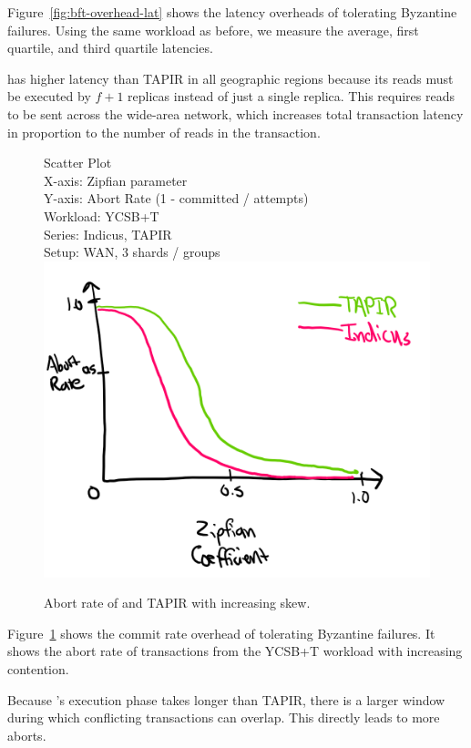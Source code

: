 Figure~\ref{fig:bft-overhead-lat} shows the latency overheads of tolerating
Byzantine failures. Using the same workload as before, we measure the average,
first quartile, and third quartile latencies. 

\sys{} has higher latency than TAPIR in all geographic regions because its
reads must be executed by $f+1$ replicas instead of just a single replica. This
requires reads to be sent across the wide-area network, which increases total
transaction latency in proportion to the number of reads in the transaction.

\begin{figure}
  Scatter Plot\\
  X-axis: Zipfian parameter\\
  Y-axis: Abort Rate (1 - committed / attempts)\\
  Workload: YCSB+T\\
  Series: Indicus, TAPIR\\
  Setup: WAN, 3 shards / groups\\
  \includegraphics[width=\columnwidth]{figures/eval/bft-overhead-aborts.png}
  \caption{Abort rate of \sys{} and TAPIR with increasing skew.}
  \label{fig:bft-overhead-aborts}
\end{figure}

Figure~\ref{fig:bft-overhead-aborts} shows the commit rate overhead of tolerating
Byzantine failures. It shows the abort rate of transactions from the YCSB+T
workload with increasing contention. 

Because \sys{}'s execution phase takes longer than TAPIR, there is a larger
window during which conflicting transactions can overlap. This directly leads
to more aborts.

